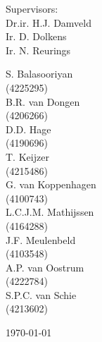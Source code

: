 \begin{titlepage}
\begin{center}
Supervisors: \\[0.2cm]
Dr.ir. H.J. Damveld \\
Ir. D. Dolkens \\
Ir. N. Reurings \\

\vspace{0.8cm}
\begin{multicols}{3}
	S. Balasooriyan \\ (4225295) \\ B.R. van Dongen \\ (4206266)\\ D.D. Hage \\ (4190696)\\ T. Keijzer \\(4215486) \\ G. van Koppenhagen \\ (4100743)\\L.C.J.M. Mathijssen \\ (4164288)\\J.F. Meulenbeld \\ (4103548)\\ A.P. van Oostrum \\ (4222784)\\S.P.C. van Schie \\ (4213602)
	\enlargethispage{15mm} \vspace{20mm}
\end{multicols}

\vfill

\begin{large}\today \end{large}

\end{center}
\end{titlepage}